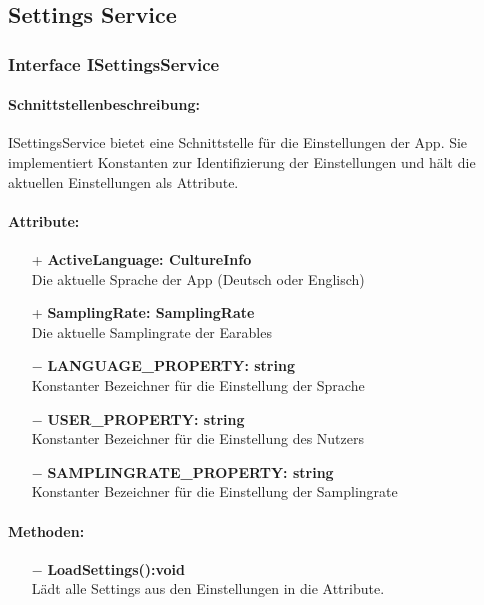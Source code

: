 \documentclass[a4paper,12pt]{article}
\begin{document}
		
		
		
		
\subsection{Settings Service}
\subsubsection{Interface ISettingsService}
	\paragraph{Schnittstellenbeschreibung:}
	ISettingsService bietet eine Schnittstelle für die Einstellungen der App. Sie implementiert Konstanten zur Identifizierung der Einstellungen und hält die aktuellen Einstellungen als Attribute.
	\paragraph{Attribute:}
	\begin{itemize}
		\item[+] \textbf{ActiveLanguage: CultureInfo}\\Die aktuelle Sprache der App (Deutsch oder Englisch)\\
		\item[+] \textbf{SamplingRate: SamplingRate}\\Die aktuelle Samplingrate der \Gls{Earables} \\ 
		\item[$-$] \textbf{LANGUAGE\_PROPERTY: string}\\Konstanter Bezeichner für die Einstellung der Sprache \\
		\item[$-$] \textbf{USER\_PROPERTY: string}\\Konstanter Bezeichner für die Einstellung des Nutzers \\
		\item[$-$] \textbf{SAMPLINGRATE\_PROPERTY: string}\\Konstanter Bezeichner für die Einstellung der Samplingrate \\
	\end{itemize}
	\paragraph{Methoden:}
	\begin{itemize}
		\item[$-$] \textbf{LoadSettings():void}\\Lädt alle Settings aus den Einstellungen in die Attribute.	
	\end{itemize}
\end{document}
